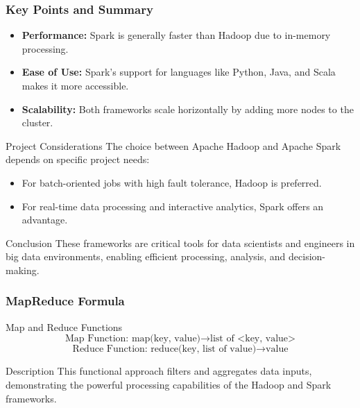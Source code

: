 \documentclass[aspectratio=169]{beamer}
\begin{document}
\begin{frame}[fragile]
    \frametitle{Key Points and Summary}
    
    \begin{itemize}
        \item \textbf{Performance:} Spark is generally faster than Hadoop due to in-memory processing.
        \item \textbf{Ease of Use:} Spark’s support for languages like Python, Java, and Scala makes it more accessible.
        \item \textbf{Scalability:} Both frameworks scale horizontally by adding more nodes to the cluster.
    \end{itemize}

    \begin{block}{Project Considerations}
    The choice between Apache Hadoop and Apache Spark depends on specific project needs:
        \begin{itemize}
            \item For batch-oriented jobs with high fault tolerance, Hadoop is preferred.
            \item For real-time data processing and interactive analytics, Spark offers an advantage.
        \end{itemize}
    \end{block}

    \begin{block}{Conclusion}
    These frameworks are critical tools for data scientists and engineers in big data environments, enabling efficient processing, analysis, and decision-making.
    \end{block}
\end{frame}

\begin{frame}[fragile]
    \frametitle{MapReduce Formula}
    
    \begin{block}{Map and Reduce Functions}
    \begin{equation}
        \text{Map Function: } \text{map(key, value)} \rightarrow \text{list of <key, value>}
    \end{equation}
    \begin{equation}
        \text{Reduce Function: } \text{reduce(key, list of value)} \rightarrow \text{value}
    \end{equation}
    \end{block}
    
    \begin{block}{Description}
    This functional approach filters and aggregates data inputs, demonstrating the powerful processing capabilities of the Hadoop and Spark frameworks.
    \end{block}
\end{frame}
\end{document}
